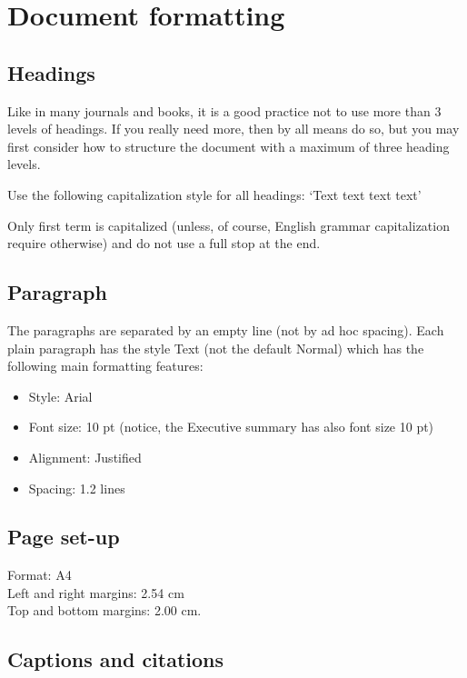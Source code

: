 \documentclass[10pt]{report}
\begin{document}
\section{ Document formatting}
\label{sec:document-formatting}

\subsection{Headings}
\label{sec:headings}

Like in many journals and books, it is a good practice not to use more than 3 levels of headings. If you really need more, then by all means do so, but you may first consider how to structure the document with a maximum of three heading levels. 

Use the following capitalization style for all headings: ‘Text text text text’

Only first term is capitalized (unless, of course, English grammar capitalization require otherwise) and do not use a full stop at the end.

\subsection{Paragraph}

The paragraphs are separated by an empty line (not by ad hoc spacing). Each plain paragraph has the style Text (not the default Normal) which has the following main formatting features:

\begin{itemize}
\item Style: Arial
    \item Font size: 10 pt (notice, the Executive summary has also font size 10 pt)
    \item Alignment: Justified
    \item Spacing: 1.2 lines
\end{itemize}

\subsection{Page set-up}
    
Format: A4\\
Left and right margins: 2.54 cm\\
Top and bottom margins: 2.00 cm.

\subsection{Captions and citations}
\end{document}
